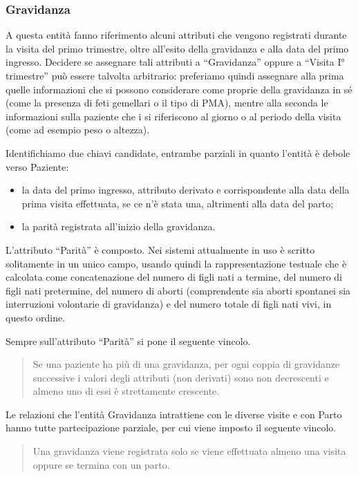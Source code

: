 \subsubsection{Gravidanza}

A questa entità fanno riferimento alcuni attributi che vengono registrati durante la visita del primo trimestre, oltre all'esito della gravidanza e alla data del primo ingresso.
Decidere se assegnare tali attributi a \enquote{Gravidanza} oppure a \enquote{Visita I° trimestre} può essere talvolta arbitrario: preferiamo quindi assegnare alla prima quelle informazioni che si possono considerare come proprie della gravidanza in sé (come la presenza di feti gemellari o il tipo di PMA), mentre alla seconda le informazioni sulla paziente che i si riferiscono al giorno o al periodo della visita (come ad esempio peso o altezza).

Identifichiamo due chiavi candidate, entrambe parziali in quanto l'entità è debole verso Paziente:
\begin{itemize}
\item la data del primo ingresso, attributo derivato e corrispondente alla data della prima visita effettuata, se ce n'è stata una, altrimenti alla data del parto;
\item la parità registrata all'inizio della gravidanza.
\end{itemize}

L'attributo \enquote{Parità} è composto.
Nei sistemi attualmente in uso è scritto solitamente in un unico campo, usando quindi la rappresentazione testuale che è calcolata come concatenazione del numero di figli nati a termine, del numero di figli nati pretermine, del numero di aborti (comprendente sia aborti spontanei sia interruzioni volontarie di gravidanza) e del numero totale di figli nati vivi, in questo ordine.

Sempre sull'attributo \enquote{Parità} si pone il seguente vincolo.
\begin{quote}
Se una paziente ha più di una gravidanza, per ogni coppia di gravidanze successive i valori degli attributi (non derivati) sono non decrescenti e almeno uno di essi è strettamente crescente.
\end{quote}

Le relazioni che l'entità Gravidanza intrattiene con le diverse visite e con Parto hanno tutte partecipazione parziale, per cui viene imposto il seguente vincolo.
\begin{quote}
Una gravidanza viene registrata solo se viene effettuata almeno una visita oppure se termina con un parto.
\end{quote}

